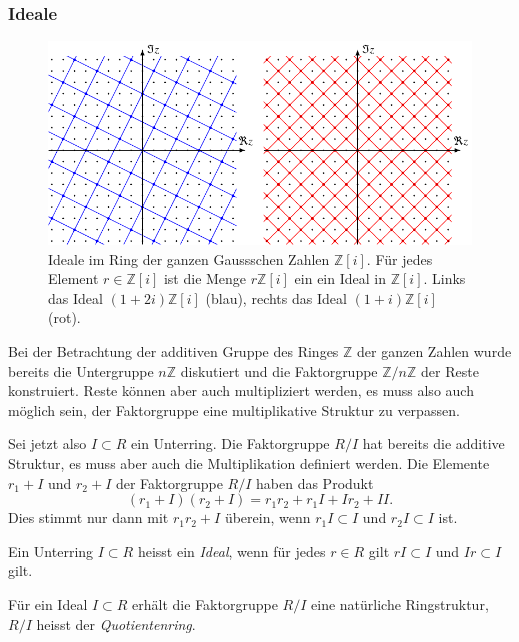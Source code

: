 \subsubsection{Ideale}
\begin{figure}
\centering
\includegraphics{chapters/10-vektorenmatrizen/images/ideale.pdf}
\caption{Ideale im Ring der ganzen Gaussschen Zahlen $\mathbb{Z}[i]$.
Für jedes Element $r\in \mathbb{Z}[i]$ ist die Menge  $r\mathbb{Z}[i]$
ein ein Ideal in $\mathbb{Z}[i]$.
Links das Ideal $(1+2i)\mathbb{Z}[i]$ (blau), rechts das Ideal
$(1+i)\mathbb{Z}[i]$ (rot).
\label{buch:vektorenmatrizen:fig:ideale}}
\end{figure}
Bei der Betrachtung der additiven Gruppe des Ringes $\mathbb{Z}$ der
ganzen Zahlen wurde bereits die Untergruppe $n\mathbb{Z}$ diskutiert
und die Faktorgruppe $\mathbb{Z}/n\mathbb{Z}$ der Reste konstruiert.
Reste können aber auch multipliziert werden, es muss also auch möglich
sein, der Faktorgruppe eine multiplikative Struktur zu verpassen.

Sei jetzt also $I\subset R$ ein Unterring.
Die Faktorgruppe $R/I$ hat bereits die additive Struktur, es muss
aber auch die Multiplikation definiert werden.
Die Elemente $r_1+I$ und $r_2+I$ der Faktorgruppe $R/I$ haben das
Produkt
\[
(r_1+I)(r_2+I)
=
r_1r_2 + r_1I + Ir_2 + II.
\]
Dies stimmt nur dann mit $r_1r_2+I$ überein, wenn $r_1I\subset I$ und
$r_2I\subset I$ ist.

\begin{definition}
Ein Unterring $I\subset R$ heisst ein {\em Ideal}, wenn für jedes $r\in R$ gilt
$rI\subset I$ und $Ir\subset I$ gilt.
%
\end{definition}

\begin{satz}
Für ein Ideal $I\subset R$
erhält die Faktorgruppe $R/I$ eine natürliche Ringstruktur, $R/I$ 
heisst der {\em Quotientenring}.
%
\end{satz}

